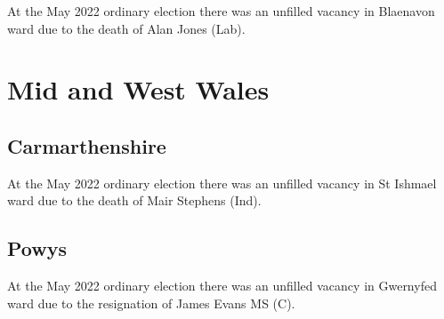 \documentclass[a4paper,openany]{book}
\begin{document}
\begin{resultsiii}
At the May 2022 ordinary election there was an unfilled vacancy in Blaenavon ward due to the death of Alan Jones (Lab).%

\section{Mid and West Wales}

\subsection*{Carmarthenshire}

At the May 2022 ordinary election there was an unfilled vacancy in St Ishmael ward due to the death of Mair Stephens (Ind).%

\subsection*{Powys}

At the May 2022 ordinary election there was an unfilled vacancy in Gwernyfed ward due to the resignation of James Evans MS (C).%

%
%
%
%
%
%
%


\end{resultsiii}
\end{document}
